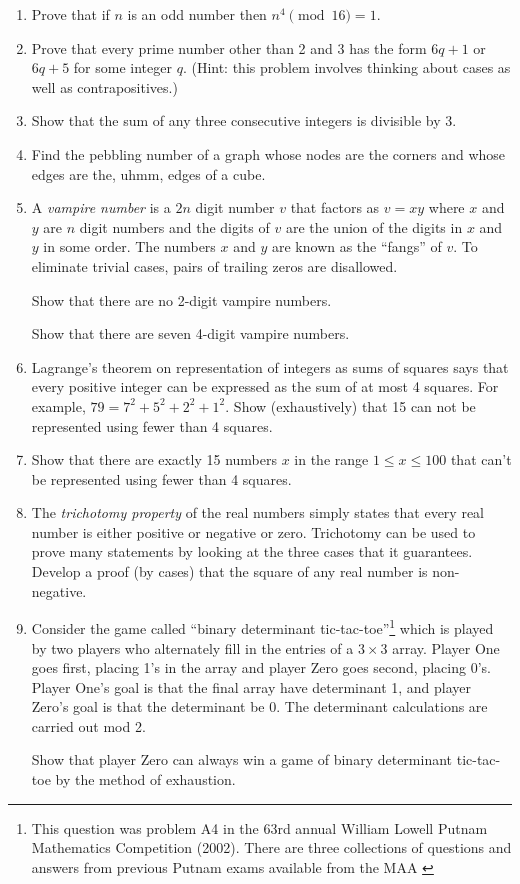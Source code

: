 \begin{enumerate}
\item Prove that if $n$ is an odd number then $n^4 \pmod{16} = 1$.

\item Prove that every prime number other than 2 and 3 has the form
$6q+1$ or $6q+5$ for some integer $q$.  (Hint: this problem involves
thinking about cases as well as contrapositives.)

\item Show that the sum of any three consecutive integers is divisible
by 3.

\item Find the pebbling number of a graph whose nodes are the corners and 
whose edges are the, uhmm, edges of a cube.

\item A \emph{vampire number} is a $2n$ digit number $v$ that factors as $v=xy$
where $x$ and $y$ are $n$ digit numbers and the digits of $v$ are the 
union of the digits in $x$ and $y$ in some order.  The numbers $x$ and $y$
are known as the ``fangs'' of $v$.  To eliminate trivial
cases, pairs of trailing zeros are disallowed.  

Show that there are no 2-digit vampire numbers.

Show that there are seven 4-digit vampire numbers.

\item Lagrange's theorem on representation of integers as sums of squares
says that every positive integer can be expressed as the sum of at most 
4 squares.  For example, $79 = 7^2 + 5^2 + 2^2 + 1^2$.  Show (exhaustively) 
that 15 can not be represented using fewer than 4 squares.

\item Show that there are exactly 15 numbers $x$ in the range $1 \leq x \leq 100$ that can't be represented using fewer than 4 squares.

\item The \emph{trichotomy property} of the real 
numbers simply states that every real number is either positive or negative 
or zero.  Trichotomy can be used to prove many statements by looking at the
three cases that it guarantees.  Develop a proof (by cases) that the square of
any real number is non-negative.

\item Consider the game called ``binary determinant tic-tac-toe''\footnote{ %
This question was problem A4 in the 63rd annual %
William Lowell Putnam Mathematics Competition (2002).  %
There are three collections of questions %
and answers  from previous Putnam exams available from the MAA %
\cite{putnam1,putnam2,putnam3}%
}
which is played by two players who alternately fill in the entries of a 
$3 \times 3$ array.  Player One goes first, placing 1's in the array and 
player Zero goes second, placing 0's.  Player One's goal is that the 
final array have determinant 1, and player Zero's goal is that the 
determinant be 0.  The determinant calculations are carried out mod 2.

Show that player Zero can always win a game of binary determinant tic-tac-toe
by the method of exhaustion.

\end{enumerate}
